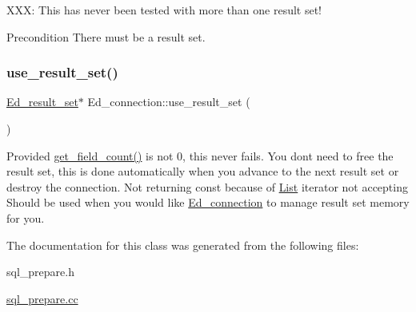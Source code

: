 X\+XX\+: This has never been tested with more than one result set!

\begin{DoxyPrecond}{Precondition}
There must be a result set. 
\end{DoxyPrecond}
\mbox{\label{classEd__connection_ab9b5405ab89c8dc49082adf1a3be3354}} 
\subsubsection{\texorpdfstring{use\+\_\+result\+\_\+set()}{use\_result\_set()}}
{\footnotesize\ttfamily \mbox{\hyperlink{classEd__result__set}{Ed\+\_\+result\+\_\+set}}$\ast$ Ed\+\_\+connection\+::use\+\_\+result\+\_\+set (\begin{DoxyParamCaption}{ }\end{DoxyParamCaption})\hspace{0.3cm}{\ttfamily [inline]}}

Provided \mbox{\hyperlink{classEd__connection_af704fb99d9029578af2d1acc301b8d51}{get\+\_\+field\+\_\+count()}} is not 0, this never fails. You don\textquotesingle{}t need to free the result set, this is done automatically when you advance to the next result set or destroy the connection. Not returning const because of \mbox{\hyperlink{classList}{List}} iterator not accepting Should be used when you would like \mbox{\hyperlink{classEd__connection}{Ed\+\_\+connection}} to manage result set memory for you. 

The documentation for this class was generated from the following files\+:\begin{DoxyCompactItemize}
\item 
sql\+\_\+prepare.\+h\item 
\mbox{\hyperlink{sql__prepare_8cc}{sql\+\_\+prepare.\+cc}}\end{DoxyCompactItemize}

